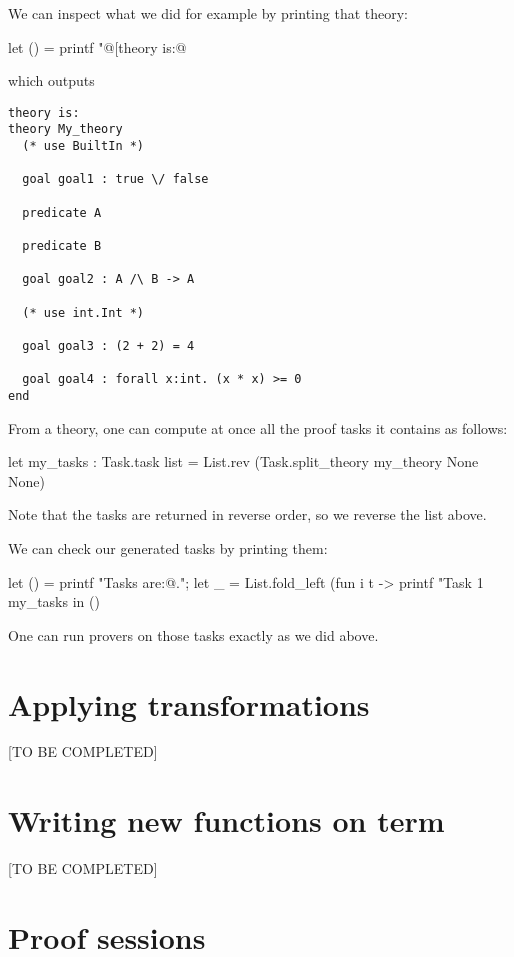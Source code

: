 We can inspect what we did for example by printing that theory:
\begin{ocamlcode}
let () = printf "@[theory is:@\n%
\end{ocamlcode}
which outputs
\begin{verbatim}
theory is:
theory My_theory
  (* use BuiltIn *)
  
  goal goal1 : true \/ false
  
  predicate A
  
  predicate B
  
  goal goal2 : A /\ B -> A
  
  (* use int.Int *)
  
  goal goal3 : (2 + 2) = 4
  
  goal goal4 : forall x:int. (x * x) >= 0
end
\end{verbatim}

From a theory, one can compute at once all the proof tasks it contains
as follows:
\begin{ocamlcode}
let my_tasks : Task.task list = 
  List.rev (Task.split_theory my_theory None None)
\end{ocamlcode}
Note that the tasks are returned in reverse order, so we reverse the
list above.

We can check our generated tasks by printing them:
\begin{ocamlcode}
let () = 
  printf "Tasks are:@.";
  let _ =
    List.fold_left
      (fun i t -> printf "Task %
      1 my_tasks
  in ()
\end{ocamlcode}

One can run provers on those tasks exactly as we did above.

\section{Applying transformations}

[TO BE COMPLETED]

\section{Writing new functions on term}

[TO BE COMPLETED]

\section{Proof sessions}

